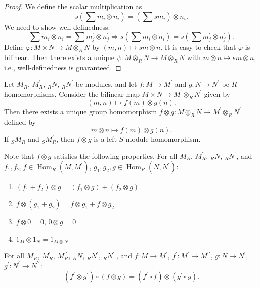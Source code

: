 \documentclass[11pt, a4paper]{report}
\begin{document}
\begin{proof}
We define the scalar multiplication as
\[
s\left(\sum m_{i} \otimes n_{i}\right)=\left(\sum s m_{i}\right) \otimes n_{i}.
\]
We need to show well-definedness:
\[
\sum m_{i} \otimes n_{i}=\sum m_{j}^{\prime} \otimes n_{j}^{\prime} \Rightarrow s\left(\sum m_{i} \otimes n_{i}\right)=s\left(\sum m_{j}^{\prime} \otimes n_{j}^{\prime}\right).
\]
Define $\varphi: M \times N \rightarrow M \otimes_{R} N$ by $(m, n) \mapsto sm \otimes n$. It is easy to check that $\varphi$ is bilinear. Then there exists a unique $\psi: M \otimes_{R} N \rightarrow M \otimes_{R} N$ with $m \otimes n \mapsto sm \otimes n$, i.e., well-definedness is guaranteed.
\end{proof}

\begin{definition}
Let $M_{R}$, $M_{R}^{\prime}$, ${}_{R}N$, ${}_{R}N^{\prime}$ be modules, and let $f: M \rightarrow M^{\prime}$ and $g: N \rightarrow N^{\prime}$ be $R$-homomorphisms. Consider the bilinear map $M \times N \rightarrow M^{\prime} \otimes_{R} N^{\prime}$ given by
\[
(m, n) \mapsto f(m) \otimes g(n).
\]
Then there exists a unique group homomorphism $f \otimes g: M \otimes_{R} N \rightarrow M^{\prime} \otimes_{R} N^{\prime}$ defined by
\[
m \otimes n \mapsto f(m) \otimes g(n).
\]
If ${}_{S}M_{R}$ and ${}_{S}M_{R}^{\prime}$, then $f \otimes g$ is a left $S$-module homomorphism.

Note that $f \otimes g$ satisfies the following properties. For all $M_{R}$, $M_{R}^{\prime}$, ${}_{R}N$, ${}_{R}N^{\prime}$, and $f_{1}, f_{2}, f \in \operatorname{Hom}_{R}(M, M^{\prime})$, $g_{1}, g_{2}, g \in \operatorname{Hom}_{R}(N, N^{\prime})$:
\begin{enumerate}
\item $(f_{1}+f_{2}) \otimes g=(f_{1} \otimes g)+(f_{2} \otimes g)$
\item $f \otimes (g_{1}+g_{2})=f \otimes g_{1}+f \otimes g_{2}$
\item $f \otimes 0=0$, $0 \otimes g=0$
\item $1_{M} \otimes 1_{N}=1_{M \otimes N}$
\end{enumerate}
For all $M_{R}$, $M_{R}^{\prime}$, $M_{R}^{\prime \prime}$, ${}_{R}N$, ${}_{R}N^{\prime}$, ${}_{R}N^{\prime \prime}$, and $f: M \rightarrow M^{\prime}$, $f^{\prime}: M^{\prime} \rightarrow M^{\prime \prime}$, $g: N \rightarrow N^{\prime}$, $g^{\prime}: N^{\prime} \rightarrow N^{\prime \prime}$:
\[
(f^{\prime} \otimes g^{\prime}) \circ (f \otimes g)=(f^{\prime} \circ f) \otimes (g^{\prime} \circ g).
\]
\end{definition}
\end{document}
